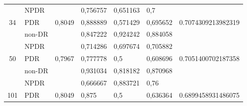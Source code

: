 \begin{table}[hbtp]
\begin{center}
\begin{tabular}{|c|l|c|l|l|l|c|}
                                  & NPDR                                               &                          & 0,756757                                          & 0,651163                                         & 0,7                                             &                                      \\ \cline{2-2} \cline{4-6}
            \multirow{-3}{*}{34}  & PDR                                                & \multirow{-3}{*}{0,8049} & 0,888889                                          & 0,571429                                         & 0,695652                                        & \multirow{-3}{*}{0.7074309213982319} \\ \hline
                                  & non-DR                                             &                          & 0,847222                                          & 0,924242                                         & 0,884058                                        &                                      \\ \cline{2-2} \cline{4-6}
                                  & NPDR                                               &                          & 0,714286                                          & 0,697674                                         & 0,705882                                        &                                      \\ \cline{2-2} \cline{4-6}
            \multirow{-3}{*}{50}  & PDR                                                & \multirow{-3}{*}{0,7967} & 0,777778                                          & 0,5                                              & 0,608696                                        & \multirow{-3}{*}{0.7051400702187358} \\ \hline
                                  & non-DR                                             &                          & 0,931034                                          & 0,818182                                         & 0,870968                                        &                                      \\ \cline{2-2} \cline{4-6}
                                  & NPDR                                               &                          & 0,666667                                          & 0,883721                                         & 0,76                                            &                                      \\ \cline{2-2} \cline{4-6}
            \multirow{-3}{*}{101} & PDR                                                & \multirow{-3}{*}{0,8049} & 0,875                                             & 0,5                                              & 0,636364                                        & \multirow{-3}{*}{0.6899458931486075} \\ \hline

\end{tabular}
\end{center}
\end{table}
